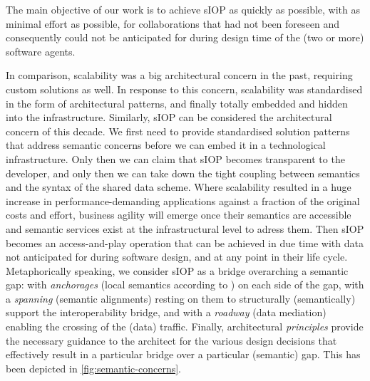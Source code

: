 \documentclass[sort&compress,preprint,authoryear,3p,twocolumn]{elsarticle}
\begin{document}
The main objective of our work is to achieve sIOP as quickly as
possible, with as minimal effort as possible, for collaborations that
had not been foreseen and consequently could not be anticipated for
during design time of the (two or more) software agents.

In comparison, scalability was a big architectural concern in the past,
requiring custom solutions as well. In response to this concern,
scalability was standardised in the form of architectural patterns, and
finally totally embedded and hidden into the infrastructure. Similarly,
sIOP can be considered the architectural concern of this decade. We
first need to provide standardised solution patterns that address
semantic concerns before we can embed it in a technological
infrastructure. Only then we can claim that sIOP becomes transparent to
the developer, and only then we can take down the tight coupling between
semantics and the syntax of the shared data scheme. Where scalability
resulted in a huge increase in performance-demanding applications
against a fraction of the original costs and effort, business agility
will emerge once their semantics are accessible and semantic services
exist at the infrastructural level to adress them. Then sIOP becomes an
access-and-play operation that can be achieved in due time with data not
anticipated for during software design, and at any point in their life
cycle. Metaphorically speaking, we consider sIOP as a bridge overarching
a semantic gap: with \emph{anchorages} (local semantics according to
\citep{Brandt2018a}) on each side of the gap, with a \emph{spanning}
(semantic alignments) resting on them to structurally (semantically)
support the interoperability bridge, and with a \emph{roadway} (data
mediation) enabling the crossing of the (data) traffic. Finally,
architectural \emph{principles} provide the necessary guidance to the
architect for the various design decisions that effectively result in a
particular bridge over a particular (semantic) gap. This has been
depicted in \cref{fig:semantic-concerns}.
\end{document}
